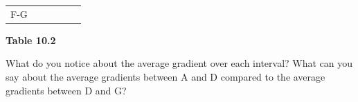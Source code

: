{\begin{center}
\begin{xtabular*}{\mytablewidth}[t]{|p{10\mystarwidth}|p{10\mystarwidth}|p{10\mystarwidth}|p{10\mystarwidth}|p{10\mystarwidth}|p{10\mystarwidth}|}
        F-G &
         &
         &
         &
         &
     \tabularnewline{}
    \end{xtabular*}
      \end{center}
    \begin{center}{\small\bfseries Table 10.2}\end{center}
        }%
    \par
      \label{m39223*id190636}
What do you notice about the average gradient over each interval? What can you
say about the average gradients between A and D compared to the average
gradients between D and G?\par 
      \label{m39223*id190641}
    \setcounter{subfigure}{0}
